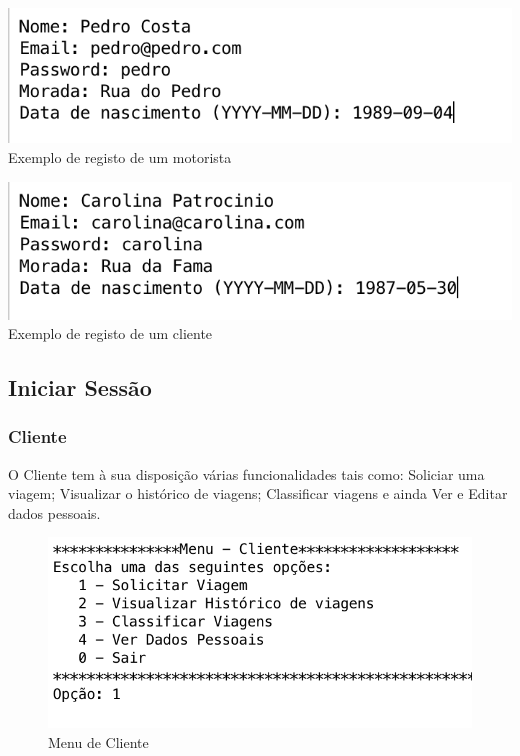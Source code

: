\noindent\begin{minipage}[b]{.4\textwidth}
	\includegraphics[scale=0.6]{imagem/exemploregistomotorista}
	\small{Exemplo de registo de um motorista}
\end{minipage} 
\hfill
\begin{minipage}[b]{.4\textwidth}
	\includegraphics[scale=0.6]{imagem/exemploderegistocliente}
	\small{Exemplo de registo de um cliente}
\end{minipage}
\hfill

\subsection{Iniciar Sessão }
\subsubsection{Cliente}
O Cliente tem à sua disposição várias funcionalidades tais como: Soliciar uma viagem; Visualizar o histórico de viagens; Classificar viagens e ainda Ver e Editar dados pessoais. 
\begin{figure}[htpb]
	\centering
	\includegraphics[scale=0.7]{imagem/menuCliente}
	\caption{Menu de Cliente }
	\label{p3:fig:p3_menuCliente}
\end{figure}

